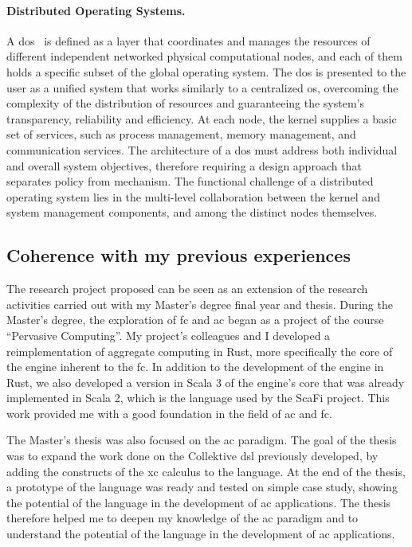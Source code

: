 \documentclass[12pt, a4paper]{article}
\begin{document}
\sloppypar
\paragraph{Distributed Operating Systems.}
A \ac{dos}~\cite{dos} is defined as a layer that coordinates and manages the resources of different independent networked
physical computational nodes,
and each of them holds a specific subset of the global operating system.
%
The \ac{dos} is presented to the user as a unified system that works similarly to a centralized \ac{os},
overcoming the complexity of the distribution of resources and guaranteeing the system's transparency, reliability and efficiency.
%
At each node,
the kernel supplies a basic set of services,
such as process management, memory management, and communication services.
%
The architecture of a \ac{dos} must address both individual and overall system objectives,
therefore requiring a design approach that separates policy from mechanism.
%
The functional challenge of a distributed operating system lies in the multi-level collaboration between the kernel
and system management components, and among the distinct nodes themselves.


\subsection{Coherence with my previous experiences}
\label{subsec:coherence-with-the-educational-path}

The research project proposed can be seen as an extension of the research activities
carried out with my Master's degree final year and thesis.
%
During the Master's degree,
the exploration of \ac{fc} and \ac{ac} began as a project of the course ``Pervasive Computing''.
%
My project's colleagues and I developed a reimplementation of aggregate computing in Rust,
more specifically the core of the engine inherent to the \ac{fc}.
%
In addition to the development of the engine in Rust,
we also developed a version in Scala 3 of the engine's core that was already implemented in Scala 2,
which is the language used by the ScaFi project.
%
This work provided me with a good foundation in the field of \ac{ac} and \ac{fc}.

The Master's thesis was also focused on the \ac{ac} paradigm.
%
The goal of the thesis was to expand the work done on the Collektive \ac{dsl} previously developed,
by adding the constructs of the \ac{xc} calculus to the language.
%
At the end of the thesis, a prototype of the language was ready and tested on simple case study,
showing the potential of the language in the development of \ac{ac} applications.
%
The thesis therefore helped me to deepen my knowledge of the \ac{ac} paradigm and to understand the potential
of the language in the development of \ac{ac} applications.
\end{document}

